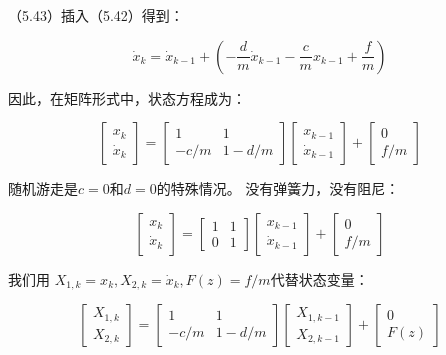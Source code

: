          
         （5.43）插入（5.42）得到：
         
          \[ \dot{x}_{k}=\dot{x}_{k-1}+(- \frac{d}{m}\dot{x}_{k-1}-\frac{c}{m}x_{k-1}+\frac{f}{m}) \]
          
          因此，在矩阵形式中，状态方程成为：
          
           \[ \begin{bmatrix}
          x_{k}\\\dot{x}_{k}
          \end{bmatrix} = \begin{bmatrix}
          1&1\\-c/m&1-d/m
          \end{bmatrix} \begin{bmatrix}
          x_{k-1}\\\dot{x}_{k-1}
          \end{bmatrix}+\begin{bmatrix}
          0\\f/m
          \end{bmatrix}\]
          
          随机游走是$ c = 0 $和$ d = 0 $的特殊情况。 没有弹簧力，没有阻尼：
          
          \begin{equation}\label{5.44}
         \begin{bmatrix}
         x_{k}\\\dot{x}_{k}
         \end{bmatrix} = \begin{bmatrix}
         1&1\\0&1
         \end{bmatrix} \begin{bmatrix}
         x_{k-1}\\\dot{x}_{k-1}
         \end{bmatrix}+\begin{bmatrix}
         0\\f/m
         \end{bmatrix} 
         \end{equation}
          
          我们用 $ X_{1,k}=x_{k},X_{2,k}=\dot{x}_{k},F(z)=f/m $代替状态变量：
          
         \begin{equation}\label{5.45}
         \begin{bmatrix}
         X_{1,k}\\X_{2,k}
         \end{bmatrix} = \begin{bmatrix}
         1&1\\-c/m&1-d/m
         \end{bmatrix} \begin{bmatrix}
         X_{1,k-1}\\X_{2,k-1}
         \end{bmatrix}+\begin{bmatrix}
         0\\F(z)
         \end{bmatrix} 
         \end{equation}
          
